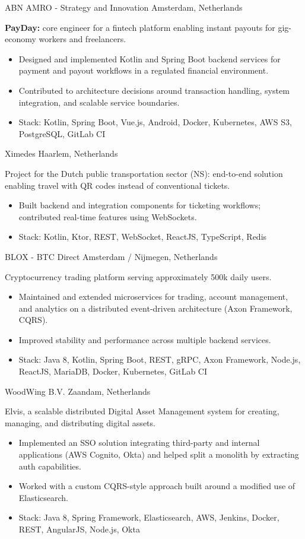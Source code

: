 \documentclass[10pt,a4paper,sans]{moderncv}
\begin{document}
{ABN AMRO - Strategy and Innovation}
{Amsterdam, Netherlands}
{}{\textbf{PayDay:} core engineer for a fintech platform enabling instant payouts for gig-economy workers and freelancers.
\begin{itemize}
 \item Designed and implemented Kotlin and Spring Boot backend services for payment and payout workflows in a regulated financial environment.
 \item Contributed to architecture decisions around transaction handling, system integration, and scalable service boundaries.
 \item Stack: Kotlin, Spring Boot, Vue.js, Android, Docker, Kubernetes, AWS S3, PostgreSQL, GitLab CI
\end{itemize}
}

{Ximedes}
{Haarlem, Netherlands}
{}{Project for the Dutch public transportation sector (NS): end-to-end solution enabling travel with QR codes instead of conventional tickets.
\begin{itemize}
 \item Built backend and integration components for ticketing workflows; contributed real-time features using WebSockets.
 \item Stack: Kotlin, Ktor, REST, WebSocket, ReactJS, TypeScript, Redis
\end{itemize}
}

{BLOX - BTC Direct}
{Amsterdam / Nijmegen, Netherlands}
{}{Cryptocurrency trading platform serving approximately 500k daily users.
\begin{itemize}
 \item Maintained and extended microservices for trading, account management, and analytics on a distributed event-driven architecture (Axon Framework, CQRS).
 \item Improved stability and performance across multiple backend services.
 \item Stack: Java 8, Kotlin, Spring Boot, REST, gRPC, Axon Framework, Node.js, ReactJS, MariaDB, Docker, Kubernetes, GitLab CI
\end{itemize}
}

{WoodWing B.V.}
{Zaandam, Netherlands}
{}{Elvis, a scalable distributed Digital Asset Management system for creating, managing, and distributing digital assets.
\begin{itemize}
 \item Implemented an SSO solution integrating third-party and internal applications (AWS Cognito, Okta) and helped split a monolith by extracting auth capabilities.
 \item Worked with a custom CQRS-style approach built around a modified use of Elasticsearch.
 \item Stack: Java 8, Spring Framework, Elasticsearch, AWS, Jenkins, Docker, REST, AngularJS, Node.js, Okta
\end{itemize}
}
\end{document}
